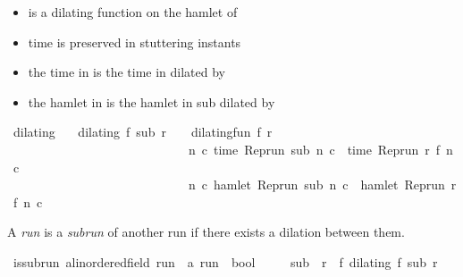 \begin{isabellebody}
\begin{isamarkuptext}
%
\begin{itemize}%
\item {} is a dilating function on the hamlet of  

\item time is preserved in stuttering instants

\item the time in  is the time in   dilated by 

\item the hamlet in  is the hamlet in sub dilated by %
\end{itemize}%
\end{isamarkuptext}\isamarkuptrue%
\isamarkupfalse%
\ dilating\isanewline
\ \ \ {\isacartoucheopen}dilating\ f\ sub\ r\ {\isasymequiv}\ \ \ dilating{\isacharunderscore}fun\ f\ r\isanewline
\ \ \ \ \ \ \ \ \ \ \ \ \ \ \ \ \ \ \ \ \ \ \ \ \ \ \ \ {\isasymand}\ {\isacharparenleft}{\isasymforall}n\ c{\isachardot}\ time\ {\isacharparenleft}{\isacharparenleft}Rep{\isacharunderscore}run\ sub{\isacharparenright}\ n\ c{\isacharparenright}\ {\isacharequal}\ time\ {\isacharparenleft}{\isacharparenleft}Rep{\isacharunderscore}run\ r{\isacharparenright}\ {\isacharparenleft}f\ n{\isacharparenright}\ c{\isacharparenright}{\isacharparenright}\isanewline
\ \ \ \ \ \ \ \ \ \ \ \ \ \ \ \ \ \ \ \ \ \ \ \ \ \ \ \ {\isasymand}\ {\isacharparenleft}{\isasymforall}n\ c{\isachardot}\ hamlet\ {\isacharparenleft}{\isacharparenleft}Rep{\isacharunderscore}run\ sub{\isacharparenright}\ n\ c{\isacharparenright}\ {\isacharequal}\ hamlet\ {\isacharparenleft}{\isacharparenleft}Rep{\isacharunderscore}run\ r{\isacharparenright}\ {\isacharparenleft}f\ n{\isacharparenright}\ c{\isacharparenright}{\isacharparenright}{\isacartoucheclose}%
\begin{isamarkuptext}%
A \emph{run}  is a \emph{subrun} of another run if there exists a dilation between them.%
\end{isamarkuptext}\isamarkuptrue%
\isamarkupfalse%
\ is{\isacharunderscore}subrun\ {\isacharcolon}{\isacharcolon}{\isacartoucheopen}{\isacharprime}a{\isacharcolon}{\isacharcolon}linordered{\isacharunderscore}field\ run\ {\isasymRightarrow}\ {\isacharprime}a\ run\ {\isasymRightarrow}\ bool{\isacartoucheclose}\ {\isacharparenleft}\ {\isachardoublequoteopen}{\isasymlless}{\isachardoublequoteclose}\ {}{}{\isacharparenright}\isanewline
{}\isanewline
\ \ {\isacartoucheopen}sub\ {\isasymlless}\ r\ {\isasymequiv}\ {\isacharparenleft}{\isasymexists}f{\isachardot}\ dilating\ f\ sub\ r{\isacharparenright}{\isacartoucheclose}%

\end{isabellebody}
